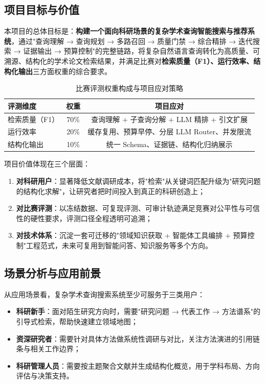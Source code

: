 \documentclass[11pt,a4paper,fontset=macnew]{ctexart}
\begin{document}
\subsection{项目目标与价值}
\label{sec:goals}

本项目的总体目标是：\textbf{构建一个面向科研场景的复杂学术查询智能搜索与推荐系统}，通过"查询理解 → 查询规划 → 多路召回 → 质量门禁 → 综合精排 → 迭代搜索 → 证据输出 → 预算控制"的完整链路，将复杂自然语言查询转化为高质量、可溯源、结构化的学术论文检索结果，并满足比赛对\textbf{检索质量（F1）、运行效率、结构化输出}三方面权重的综合要求。

\begin{table}[H]
\centering
\caption{比赛评测权重构成与项目应对策略}
\label{tab:weights}
\small
\begin{tabular}{@{}lcc@{}}
\toprule
\textbf{评测维度} & \textbf{权重} & \textbf{项目应对} \\
\midrule
检索质量（F1） & 70\% & 查询理解 + 子查询分解 + LLM 精排 + 引文扩展 \\
运行效率 & 20\% & 缓存复用、预算早停、分层 LLM Router、并发限流 \\
结构化输出 & 10\% & 统一 Schema、证据链、结构化归纳展示 \\
\bottomrule
\end{tabular}
\end{table}

项目价值体现在三个层面：

\begin{enumerate}
  \item \textbf{对科研用户}：显著降低文献调研成本，将"检索"从关键词匹配升级为"研究问题的结构化求解"，让研究者把时间投入到真正的科研创造上；
  \item \textbf{对比赛评测}：以冻结数据、可复现评测、可审计轨迹满足竞赛对公平性与可信性的硬性要求，评测口径全程透明可追溯；
  \item \textbf{对技术体系}：沉淀一套可迁移的"领域知识获取 + 智能体工具编排 + 预算控制"工程范式，未来可复用到智能问答、知识服务等多个方向。
\end{enumerate}

\subsection{场景分析与应用前景}
\label{sec:scenario}

从应用场景看，复杂学术查询搜索系统至少可服务于三类用户：

\begin{itemize}
  \item \textbf{科研新手}：面对陌生研究方向时，需要"研究问题 → 代表工作 → 方法谱系"的引导式检索，帮助快速建立领域地图；
  \item \textbf{资深研究者}：需要针对具体方法做系统性调研与对比，关注方法演进的引用链条与相关工作边界；
  \item \textbf{科研管理人员}：需要按主题聚合文献并生成结构化概览，用于学科布局、方向评估与决策支持。
\end{itemize}
\end{document}
